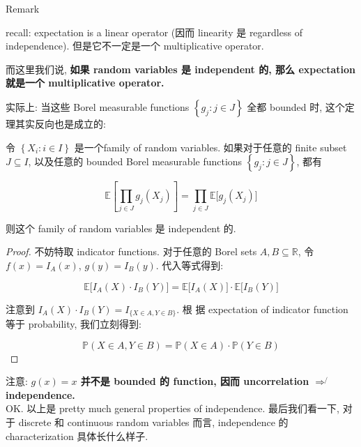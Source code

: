 \documentclass{qlnotes-export}
\begin{document}
\begin{qlremark}{Remark}

recall: expectation is a linear operator (因而 linearity 是 regardless of independence). 但是它不一定是一个 multiplicative operator.

而这里我们说, \textbf{如果 random variables 是 independent 的, 那么 expectation 就是一个 multiplicative operator.}

\end{qlremark}

实际上: 当这些 Borel measurable functions \(\left\{ {g_{j}:j \in J} \right\}\) 全都 bounded 时, 这个定理其实反向也是成立的:

\begin{theorem}

令 \(\left\{ {X_{i}:i \in I} \right\}\) 是一个family of random variables. 如果对于任意的 finite subset \(J \subseteq I\), 以及任意的 bounded Borel measurable functions \(\left\{ {g_{j}:j \in J} \right\}\), 都有

\[{\mathbb{E}}\left\lbrack {\prod\limits_{j \in J}g_{j}(X_{j})} \right\rbrack = \prod\limits_{j \in J}{\mathbb{E}}\lbrack g_{j}(X_{j})\rbrack\]

则这个 family of random variables 是 independent 的.

\end{theorem}

\begin{proof}

不妨特取 indicator functions. 对于任意的 Borel sets \(A,B \subseteq {\mathbb{R}}\), 令 \(f(x) = I_{A}(x)\), \(g(y) = I_{B}(y)\). 代入等式得到:

\[{\mathbb{E}}\lbrack I_{A}(X) \cdot I_{B}(Y)\rbrack = {\mathbb{E}}\lbrack I_{A}(X)\rbrack \cdot {\mathbb{E}}\lbrack I_{B}(Y)\rbrack\]

注意到 \(I_{A}(X) \cdot I_{B}(Y) = I_{\{{X \in A,Y \in B}\}}\). 根 据 expectation of indicator function 等于 probability, 我们立刻得到:

\[{\mathbb{P}}(X \in A,Y \in B) = {\mathbb{P}}(X \in A) \cdot {\mathbb{P}}(Y \in B)\]

\end{proof}

注意: \textbf{\(g(x) = x\) 并不是 bounded 的 function, 因而 uncorrelation \(\operatorname{\Longrightarrow\not{}}\) independence.}\\
OK. 以上是 pretty much general properties of independence. 最后我们看一下, 对于 discrete 和 continuous random variables 而言, independence 的 characterization 具体长什么样子.
\end{document}
